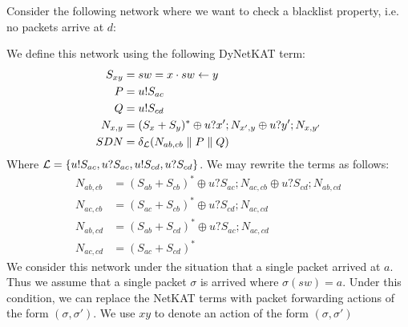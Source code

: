 \begin{example}
    Consider the following network where we want to check a blacklist
    property, i.e. no packets arrive at $d$:
    \begin{center}
    \end{center}
    We define this network using the following DyNetKAT term:
    \begin{align*}
        S_{xy}  & = sw = x \cdot sw \leftarrow y              \\
        P       & = u!S_{ac}                         \\
        Q       & = u!S_{cd}                         \\
        N_{x,y} & = (S_x+S_y)^* \oplus u?x';N_{x',y}
        \oplus u?y';N_{x,y'}                         \\
        SDN     & = \delta_{\mathcal{L}} (N_{ab,cb} 
        \parallel P \parallel Q)
    \end{align*}
    Where $\mathcal{L} = \{u!S_{ac},u?S_{ac},u!S_{cd},u?S_{cd}\}$.
    We may rewrite the terms as follows:
    \begin{align*}
        N_{ab,cb} & = (S_{ab} + S_{cb})^* \oplus u?S_{ac};N_{ac,cb}
        \oplus u?S_{cd};N_{ab,cd}                                   \\
        N_{ac,cb} & = (S_{ac}+S_{cb})^* \oplus u?S_{cd};N_{ac,cd}   \\
        N_{ab,cd} & = (S_{ab}+S_{cd})^* \oplus u?S_{ac};N_{ac,cd}   \\
        N_{ac,cd} & = (S_{ac}+S_{cd})^*
    \end{align*}
    We consider this network under the situation that a single packet 
    arrived at $a$.
    Thus we assume that a single packet $\sigma$ is arrived where 
    $\sigma(sw) = a$.
    Under this condition, we can replace the NetKAT terms with
    packet forwarding actions of the form $(\sigma, \sigma')$.
    We use $xy$ to denote an action of the form $(\sigma,\sigma')$

\end{example}
